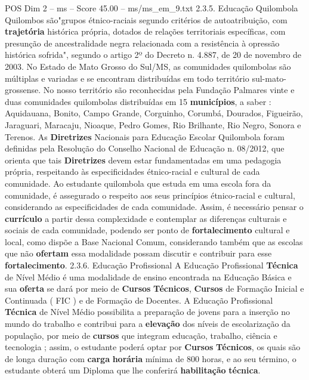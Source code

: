 \begin{textsample}{POS Dim 2 – ms – Score 45.00 – ms/ms\_em\_9.txt}  \label{ex:f2_pos_041}
2.3.5.
Educação Quilombola Quilombos são"grupos étnico-raciais segundo critérios de autoatribuição, com \textbf{trajetória} histórica própria, dotados de relações territoriais específicas, com presunção de ancestralidade negra relacionada com a resistência à opressão histórica sofrida", segundo o artigo 2º do Decreto n. 4.887, de 20 de novembro de 2003.
No Estado de Mato Grosso do Sul/MS, as comunidades quilombolas são múltiplas e variadas e se encontram distribuídas em todo território sul-mato-grossense.
No nosso território são reconhecidas pela Fundação Palmares vinte e duas comunidades quilombolas distribuídas em 15 \textbf{municípios}, a saber : Aquidauana, Bonito, Campo Grande, Corguinho, Corumbá, Dourados, Figueirão, Jaraguari, Maracaju, Nioaque, Pedro Gomes, Rio Brilhante, Rio Negro, Sonora e Terenos.
As \textbf{Diretrizes} Nacionais para Educação Escolar Quilombola foram definidas pela Resolução do Conselho Nacional de Educação n. 08/2012, que orienta que tais \textbf{Diretrizes} devem estar fundamentadas em uma pedagogia própria, respeitando às especificidades étnico-racial e cultural de cada comunidade.
Ao estudante quilombola que estuda em uma escola fora da comunidade, é assegurado o respeito aos seus princípios étnico-racial e cultural, considerando as especificidades de cada comunidade.
Assim, é necessário pensar o \textbf{currículo} a partir dessa complexidade e contemplar as diferenças culturais e sociais de cada comunidade, podendo ser ponto de \textbf{fortalecimento} cultural e local, como dispõe a Base Nacional Comum, considerando também que as escolas que não \textbf{ofertam} essa modalidade possam discutir e contribuir para esse \textbf{fortalecimento}. 2.3.6.
Educação Profissional A Educação Profissional \textbf{Técnica} de Nível Médio é uma modalidade de ensino encontrada na Educação Básica e sua \textbf{oferta} se dará por meio de \textbf{Cursos} \textbf{Técnicos}, \textbf{Cursos} de Formação Inicial e Continuada ( FIC ) e de Formação de Docentes.
A Educação Profissional \textbf{Técnica} de Nível Médio possibilita a preparação de jovens para a inserção no mundo do trabalho e contribui para a \textbf{elevação} dos níveis de escolarização da população, por meio de \textbf{cursos} que integram educação, trabalho, ciência e tecnologia ; assim, o estudante poderá optar por \textbf{Cursos} \textbf{Técnicos}, os quais são de longa duração com \textbf{carga} \textbf{horária} mínima de 800 horas, e ao seu término, o estudante obterá um Diploma que lhe conferirá \textbf{habilitação} \textbf{técnica}.

\end{textsample}

